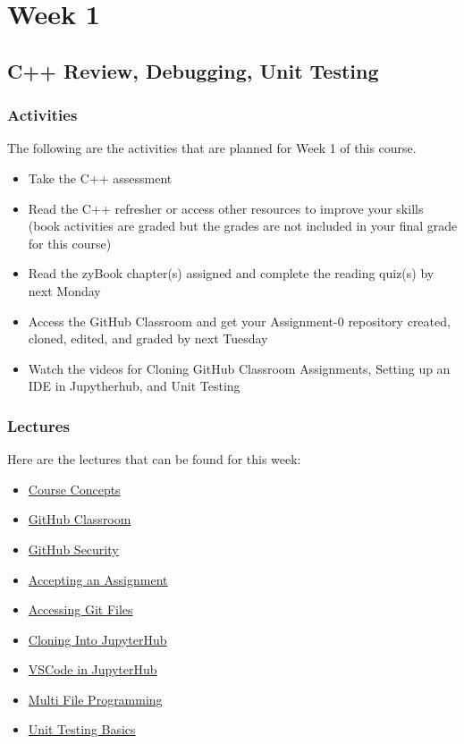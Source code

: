 \clearpage
\chapter{Week 1}

\section{C++ Review, Debugging, Unit Testing}
\horizontalline

\subsection{Activities}
The following are the activities that are planned for Week 1 of this course.
\begin{itemize}
    \item Take the C++ assessment
    \item Read the C++ refresher or access other resources to improve your skills
    (book activities are graded but the grades are not included in your final grade for this course)
    \item Read the zyBook chapter(s) assigned and complete the reading quiz(s) by next Monday
    \item Access the GitHub Classroom and get your Assignment-0 repository created, cloned, edited, and graded by next Tuesday
    \item Watch the videos for Cloning GitHub Classroom Assignments, Setting up an IDE in Jupytherhub, and Unit Testing
\end{itemize}

\subsection{Lectures}

Here are the lectures that can be found for this week:
\begin{itemize}
    \item \href{https://applied.cs.colorado.edu/mod/hvp/view.php?id=45851}{Course Concepts}
    \item \href{https://applied.cs.colorado.edu/mod/hvp/view.php?id=45853}{GitHub Classroom}
    \item \href{https://applied.cs.colorado.edu/mod/page/view.php?id=45854}{GitHub Security}
    \item \href{https://applied.cs.colorado.edu/mod/hvp/view.php?id=45855}{Accepting an Assignment}
    \item \href{https://applied.cs.colorado.edu/mod/page/view.php?id=45856}{Accessing Git Files}
    \item \href{https://applied.cs.colorado.edu/mod/url/view.php?id=45857}{Cloning Into JupyterHub}
    \item \href{https://applied.cs.colorado.edu/mod/hvp/view.php?id=45859}{VSCode in JupyterHub}
    \item \href{https://applied.cs.colorado.edu/mod/hvp/view.php?id=45860}{Multi File Programming}
    \item \href{https://applied.cs.colorado.edu/mod/hvp/view.php?id=45862}{Unit Testing Basics}
\end{itemize}

